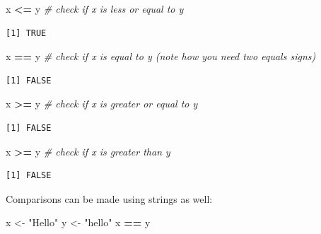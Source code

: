\documentclass[
]{article}
\newenvironment{Shaded}{\begin{snugshade}}{\end{snugshade}}
\newcommand{\CommentTok}[1]{\textcolor[rgb]{0.56,0.35,0.01}{\textit{#1}}}
\newcommand{\NormalTok}[1]{#1}
\newcommand{\OperatorTok}[1]{\textcolor[rgb]{0.81,0.36,0.00}{\textbf{#1}}}
\newcommand{\StringTok}[1]{\textcolor[rgb]{0.31,0.60,0.02}{#1}}
\begin{document}
\begin{Shaded}
\begin{Highlighting}[]
\NormalTok{x }\OperatorTok{<=}\StringTok{ }\NormalTok{y  }\CommentTok{# check if x is less or equal to y}
\end{Highlighting}
\end{Shaded}

\begin{verbatim}
[1] TRUE
\end{verbatim}

\begin{Shaded}
\begin{Highlighting}[]
\NormalTok{x }\OperatorTok{==}\StringTok{ }\NormalTok{y  }\CommentTok{# check if x is equal to y (note how you need two equals signs)}
\end{Highlighting}
\end{Shaded}

\begin{verbatim}
[1] FALSE
\end{verbatim}

\begin{Shaded}
\begin{Highlighting}[]
\NormalTok{x }\OperatorTok{>=}\StringTok{ }\NormalTok{y  }\CommentTok{# check if x is greater or equal to y }
\end{Highlighting}
\end{Shaded}

\begin{verbatim}
[1] FALSE
\end{verbatim}

\begin{Shaded}
\begin{Highlighting}[]
\NormalTok{x }\OperatorTok{>=}\StringTok{ }\NormalTok{y  }\CommentTok{# check if x is greater than y }
\end{Highlighting}
\end{Shaded}

\begin{verbatim}
[1] FALSE
\end{verbatim}

Comparisons can be made using strings as well:

\begin{Shaded}
\begin{Highlighting}[]
\NormalTok{x <-}\StringTok{ "Hello"}
\NormalTok{y <-}\StringTok{ "hello"}
\NormalTok{x }\OperatorTok{==}\StringTok{ }\NormalTok{y}
\end{Highlighting}
\end{Shaded}
\end{document}

